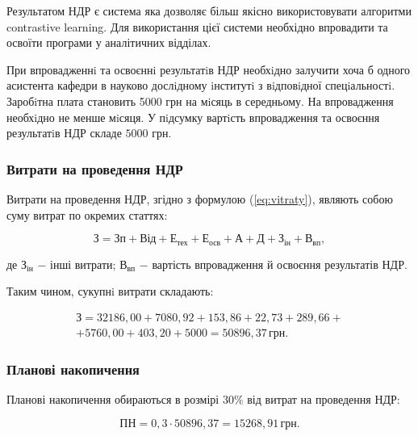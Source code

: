 Результатом НДР є система яка дозволяє більш якісно використовувати алгоритми contrastive learning. Для використання цієї системи необхідно впровадити та освоїти програми у аналітичних відділах.

При впровадженнi та освоєннi результатiв НДР необхiдно залучити хоча б одного асистента кафедри в науково дослiдному iнститутi з вiдповiдної спецiальностi. Заробiтна плата становить 5000 грн на мiсяць в середньому. На впровадження необхiдно не менше мiсяця. У пiдсумку вартiсть впровадження та освоєння результатiв НДР складе $5000$ грн.

\subsubsection{Витрати на проведення НДР}

Витрати на проведення НДР, згідно з формулою (\ref{eq:vitraty}), являють собою суму витрат по окремих статтях:

\begin{equation}\label{eq:vitraty}
\text{З} = \text{Зп} + \text{Від} + \text{Е}_{\text{тех}} + \text{Е}_{\text{осв}} + \text{А} + \text{Д} + \text{З}_{\text{ін}} + \text{В}_{\text{вп}},
\end{equation}

\noindent де $\text{З}_{\text{ін}}$ $-$ інші витрати; \newline
\hspace*{15pt} $ \text{В}_{\text{вп}}$ $-$ вартість впровадження й освоєння результатів НДР.

Таким чином, сукупнi витрати складають:

\begin{eqnarray*}
\text{З} = 32186,00 + 7080,92 + 153,86 + 22,73 + 289,66 + \\ + 5760,00 + 403,20 + 5000  = 50896,37 \, \text{грн}.
\end{eqnarray*}

\vspace{1.5em}

\subsubsection{Планові накопичення}

Планові накопичення обираються в розмірі $30\%$ від витрат на проведення НДР: 

\[
\text{ПН} = 0,3 \cdot 50896,37 = 15268,91 \, \text{грн}.
\]

\vspace{1.5em}

